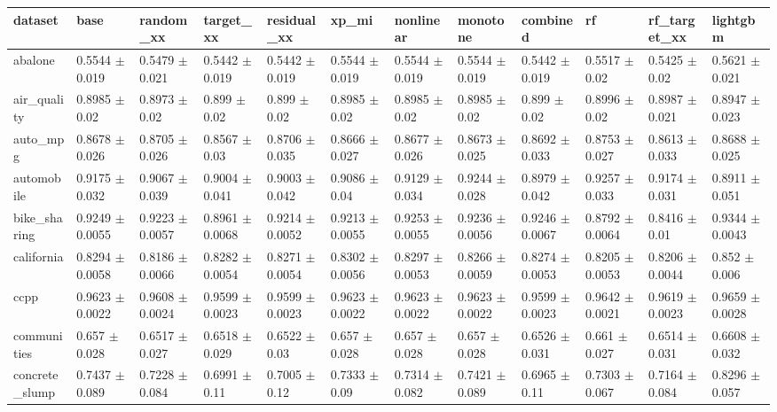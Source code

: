 \begin{tabular}{llllllllllll}
\toprule
dataset & base & random\_xx & target\_xx & residual\_xx & xp\_mi & nonlinear & monotone & combined & rf & rf\_target\_xx & lightgbm \\
\midrule
abalone & 0.5544 $\pm$ 0.019 & 0.5479 $\pm$ 0.021 & 0.5442 $\pm$ 0.019 & 0.5442 $\pm$ 0.019 & 0.5544 $\pm$ 0.019 & 0.5544 $\pm$ 0.019 & 0.5544 $\pm$ 0.019 & 0.5442 $\pm$ 0.019 & 0.5517 $\pm$ 0.02 & 0.5425 $\pm$ 0.02 & 0.5621 $\pm$ 0.021 \\
air\_quality & 0.8985 $\pm$ 0.02 & 0.8973 $\pm$ 0.02 & 0.899 $\pm$ 0.02 & 0.899 $\pm$ 0.02 & 0.8985 $\pm$ 0.02 & 0.8985 $\pm$ 0.02 & 0.8985 $\pm$ 0.02 & 0.899 $\pm$ 0.02 & 0.8996 $\pm$ 0.02 & 0.8987 $\pm$ 0.021 & 0.8947 $\pm$ 0.023 \\
auto\_mpg & 0.8678 $\pm$ 0.026 & 0.8705 $\pm$ 0.026 & 0.8567 $\pm$ 0.03 & 0.8706 $\pm$ 0.035 & 0.8666 $\pm$ 0.027 & 0.8677 $\pm$ 0.026 & 0.8673 $\pm$ 0.025 & 0.8692 $\pm$ 0.033 & 0.8753 $\pm$ 0.027 & 0.8613 $\pm$ 0.033 & 0.8688 $\pm$ 0.025 \\
automobile & 0.9175 $\pm$ 0.032 & 0.9067 $\pm$ 0.039 & 0.9004 $\pm$ 0.041 & 0.9003 $\pm$ 0.042 & 0.9086 $\pm$ 0.04 & 0.9129 $\pm$ 0.034 & 0.9244 $\pm$ 0.028 & 0.8979 $\pm$ 0.042 & 0.9257 $\pm$ 0.033 & 0.9174 $\pm$ 0.031 & 0.8911 $\pm$ 0.051 \\
bike\_sharing & 0.9249 $\pm$ 0.0055 & 0.9223 $\pm$ 0.0057 & 0.8961 $\pm$ 0.0068 & 0.9214 $\pm$ 0.0052 & 0.9213 $\pm$ 0.0055 & 0.9253 $\pm$ 0.0055 & 0.9236 $\pm$ 0.0056 & 0.9246 $\pm$ 0.0067 & 0.8792 $\pm$ 0.0064 & 0.8416 $\pm$ 0.01 & 0.9344 $\pm$ 0.0043 \\
california & 0.8294 $\pm$ 0.0058 & 0.8186 $\pm$ 0.0066 & 0.8282 $\pm$ 0.0054 & 0.8271 $\pm$ 0.0054 & 0.8302 $\pm$ 0.0056 & 0.8297 $\pm$ 0.0053 & 0.8266 $\pm$ 0.0059 & 0.8274 $\pm$ 0.0053 & 0.8205 $\pm$ 0.0053 & 0.8206 $\pm$ 0.0044 & 0.852 $\pm$ 0.006 \\
ccpp & 0.9623 $\pm$ 0.0022 & 0.9608 $\pm$ 0.0024 & 0.9599 $\pm$ 0.0023 & 0.9599 $\pm$ 0.0023 & 0.9623 $\pm$ 0.0022 & 0.9623 $\pm$ 0.0022 & 0.9623 $\pm$ 0.0022 & 0.9599 $\pm$ 0.0023 & 0.9642 $\pm$ 0.0021 & 0.9619 $\pm$ 0.0023 & 0.9659 $\pm$ 0.0028 \\
communities & 0.657 $\pm$ 0.028 & 0.6517 $\pm$ 0.027 & 0.6518 $\pm$ 0.029 & 0.6522 $\pm$ 0.03 & 0.657 $\pm$ 0.028 & 0.657 $\pm$ 0.028 & 0.657 $\pm$ 0.028 & 0.6526 $\pm$ 0.031 & 0.661 $\pm$ 0.027 & 0.6514 $\pm$ 0.031 & 0.6608 $\pm$ 0.032 \\
concrete\_slump & 0.7437 $\pm$ 0.089 & 0.7228 $\pm$ 0.084 & 0.6991 $\pm$ 0.11 & 0.7005 $\pm$ 0.12 & 0.7333 $\pm$ 0.09 & 0.7314 $\pm$ 0.082 & 0.7421 $\pm$ 0.089 & 0.6965 $\pm$ 0.11 & 0.7303 $\pm$ 0.067 & 0.7164 $\pm$ 0.084 & 0.8296 $\pm$ 0.057 \\

\end{tabular}
